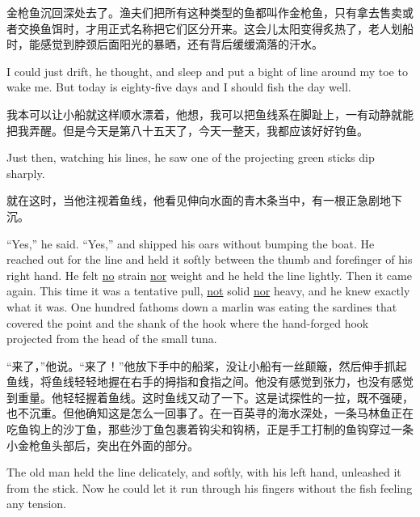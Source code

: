 \begin{paracol}{2}
\switchcolumn

金枪鱼沉回深处去了。渔夫们把所有这种类型的鱼都叫作金枪鱼，只有拿去售卖或者交换鱼饵时，才用正式名称把它们区分开来。这会儿太阳变得炙热了，老人划船时，能感觉到脖颈后面阳光的暴晒，还有背后缓缓滴落的汗水。

\switchcolumn*

I could just drift, he thought, and sleep and put a \gls{bight} of line
around my \gls{toe} to wake me. But today is eighty-five days and I should
fish the day well.

\switchcolumn

我本可以让小船就这样顺水漂着，他想，我可以把鱼线系在脚趾上，一有动静就能把我弄醒。但是今天是第八十五天了，今天一整天，我都应该好好钓鱼。

\switchcolumn*

Just then, watching his lines, he saw one of the projecting green
sticks dip sharply.

\switchcolumn

就在这时，当他注视着鱼线，他看见伸向水面的青木条当中，有一根正急剧地下沉。

\switchcolumn*

``Yes,'' he said. ``Yes,'' and shipped his oars without \gls{bumping} the
boat. He reached out for the line and held it softly between the \gls{thumb}
and \gls{forefinger} of his right hand. He felt \uline{no} \gls{strain}
\uline{nor} weight and he held the line lightly. Then it came again. This
time it was a \gls{tentative} pull, \uline{not} \gls{solid} \uline{nor}
heavy, and he knew exactly what it was. One hundred fathoms down a marlin
was eating the sardines that covered the point and the shank of the hook
where the hand-\gls{forged} hook projected from the head of the small tuna.

\switchcolumn

“来了，”他说。“来了！”他放下手中的船桨，没让小船有一丝颠簸，然后伸手抓起鱼线，将鱼线轻轻地握在右手的拇指和食指之间。他没有感觉到张力，也没有感觉到重量。他轻轻握着鱼线。这时鱼线又动了一下。这是试探性的一拉，既不强硬，也不沉重。但他确知这是怎么一回事了。在一百英寻的海水深处，一条马林鱼正在吃鱼钩上的沙丁鱼，那些沙丁鱼包裹着钩尖和钩柄，正是手工打制的鱼钩穿过一条小金枪鱼头部后，突出在外面的部分。

\switchcolumn*

The old man held the line delicately, and softly, with his left hand,
\gls{unleashed} it from the stick. Now he could let it run through his
fingers without the fish feeling any \gls{tension}.


\end{paracol}
